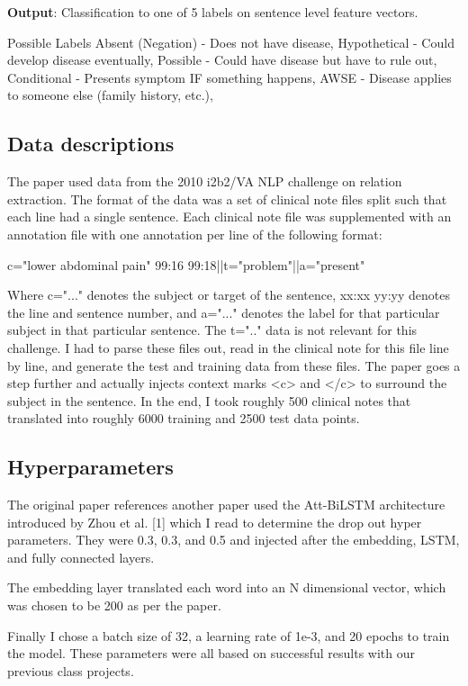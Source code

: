 \documentclass[11pt,a4paper]{article}
\begin{document}
\textbf{Output}: Classification to one of 5 labels on sentence level feature vectors.

Possible Labels
Absent (Negation) - Does not have disease,
Hypothetical - Could develop disease eventually,
Possible - Could have disease but have to rule out,
Conditional - Presents symptom IF something happens,
AWSE - Disease applies to someone else (family history, etc.),

\subsection{Data descriptions}
The paper used data from the 2010 i2b2/VA NLP challenge on relation extraction. The format of the data was a set of clinical note files split such that each line had a single sentence. Each clinical note file was supplemented with an annotation file with one annotation per line of the following format:

c="lower abdominal pain" 99:16 99:18||t="problem"||a="present"

Where c="..." denotes the subject or target of the sentence, xx:xx yy:yy denotes the line and sentence number, and a="..." denotes the label for that particular subject in that particular sentence. The t=".." data is not relevant for this challenge. I had to parse these files out, read in the clinical note for this file line by line, and generate the test and training data from these files. The paper goes a step further and actually injects context marks <c> and </c> to surround the subject in the sentence. In the end, I took roughly 500 clinical notes that translated into roughly 6000 training and 2500 test data points.

\subsection{Hyperparameters}
The original paper references another paper used the Att-BiLSTM architecture introduced by Zhou et al. [1] which I read to determine the drop out hyper parameters. They were 0.3, 0.3, and 0.5 and injected after the embedding, LSTM, and fully connected layers. 

The embedding layer translated each word into an N dimensional vector, which was chosen to be 200 as per the paper.

Finally I chose a batch size of 32, a learning rate of 1e-3, and 20 epochs to train the model. These parameters were all based on successful results with our previous class projects.
\end{document}
